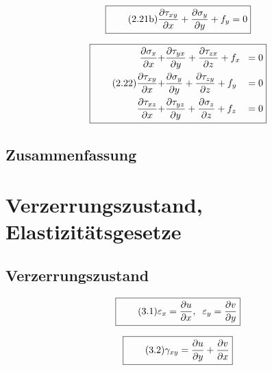 \documentclass[11pt]{article}
\newcommand{\1}{ {\mathds{1}} }
\begin{document}
		\begin{equation}
			\boxed{
				\tag{2.21b}
				\begin{split}
					\frac{\partial\tau_{xy}}{\partial x}
					+
					\frac{\partial\sigma_{y}}{\partial y}
					+
					f_y
					=
					0
				\end{split}
			}
		\end{equation}

		\begin{equation}
			\boxed{
				\tag{2.22}
				\begin{split}
					\frac{\partial\sigma_{x}}{\partial x}
					+
					&\frac{\partial\tau_{yx}}{\partial y}
					+
					\frac{\partial\tau_{zx}}{\partial z}
					+
					f_x\!&= 0 \\
					\frac{\partial\tau_{xy}}{\partial x}
					+
					&\frac{\partial\sigma_{y}}{\partial y}
					+
					\frac{\partial\tau_{zy}}{\partial z}
					+
					f_y\!&= 0 \\
					\frac{\partial\tau_{xz}}{\partial x}
					+
					&\frac{\partial\tau_{yz}}{\partial y}
					+
					\frac{\partial\sigma_{z}}{\partial z}
					+
					f_z\!&= 0 \\
				\end{split}
			}
		\end{equation}		

		\subsection{Zusammenfassung}
		
		\section{Verzerrungszustand, Elastizitätsgesetze}
		\subsection{Verzerrungszustand}

		\begin{equation}
			\boxed{
				\tag{3.1}
				\begin{split}
					\varepsilon_x
					=
					\frac{\partial u}{\partial x}, \;\;
					\varepsilon_y
					=
					\frac{\partial v}{\partial y}				 
				\end{split}
			}
		\end{equation}		

		\begin{equation}
			\boxed{
				\tag{3.2}
				\begin{split}
					\gamma_{xy}
					=
					\frac{\partial u}{\partial y}
					+
					\frac{\partial v}{\partial x}
				\end{split}
			}
		\end{equation}		
\end{document}
